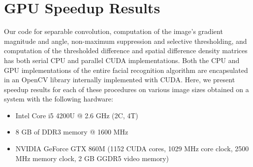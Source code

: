 \documentclass[journal]{IEEEtran}
\begin{document}
\section{GPU Speedup Results}
\label{results}
Our code for separable convolution, computation of the image's gradient magnitude and angle, non-maximum suppression and selective thresholding, and computation of the thresholded difference and spatial difference density matrices has both serial CPU and parallel CUDA implementations. Both the CPU and GPU implementations of the entire facial recognition algorithm are encapsulated in an OpenCV library internally implemented with CUDA. Here, we present speedup results for each of these procedures on various image sizes obtained on a system with the following hardware:
\begin{itemize}
	\item Intel Core i5 4200U @ 2.6 GHz (2C, 4T)
	\item 8 GB of DDR3 memory @ 1600 MHz
	\item NVIDIA GeForce GTX 860M (1152 CUDA cores, 1029 MHz core clock, 2500 MHz memory clock, 2 GB GGDR5 video memory)
\end{itemize}
\end{document}
